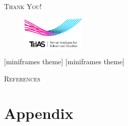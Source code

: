 \documentclass[compress]{beamer}
\begin{document}

\section*{} %

\begin{frame}
  \vfill
  \centering
  \textcolor{Rich_Red}{\Huge\scshape{Thank You!}}
  \vfill

  \begin{figure}[h!]
    \includegraphics[height=1.5cm]{TEIAS-LOGO}
  \end{figure}

[miniframes theme]
[miniframes theme]

\titlegraphic{}
\end{frame}

\begin{frame}[allowframebreaks]{\textsc{References}}
  
\end{frame}


\appendix

\section*{Appendix}
\end{document}
